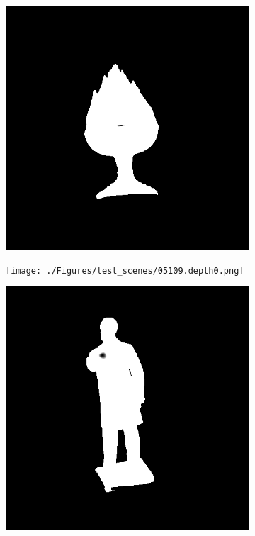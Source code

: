 \documentclass[border=15pt, multi, tikz]{article}
\begin{document}
\begin{figure}[H]
	
	\begin{subfigure}[b]{0.18\linewidth}
		\includegraphics[width=\linewidth]{./Figures/test_scenes/05051.depth0.png}
	\end{subfigure}
	\begin{subfigure}[b]{0.18\linewidth}
		\texttt{[image: ./Figures/test\_scenes/05109.depth0.png]}
	\end{subfigure}
	\begin{subfigure}[b]{0.18\linewidth}
		\includegraphics[width=\linewidth]{./Figures/test_scenes/05111.depth0.png}

\end{subfigure}
\end{figure}
\end{document}
